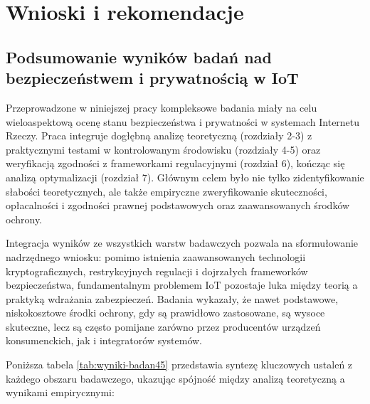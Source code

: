 \chapter{Wnioski i rekomendacje}
\label{chap:rozdzial8}

\section{Podsumowanie wyników badań nad bezpieczeństwem i prywatnością w IoT}

Przeprowadzone w niniejszej pracy kompleksowe badania miały na celu wieloaspektową ocenę stanu bezpieczeństwa i prywatności w systemach Internetu Rzeczy. Praca integruje dogłębną analizę teoretyczną (rozdziały 2-3) z praktycznymi testami w kontrolowanym środowisku (rozdziały 4-5) oraz weryfikacją zgodności z frameworkami regulacyjnymi (rozdział 6), kończąc się analizą optymalizacji (rozdział 7). Głównym celem było nie tylko zidentyfikowanie słabości teoretycznych, ale także empiryczne zweryfikowanie skuteczności, opłacalności i zgodności prawnej podstawowych oraz zaawansowanych środków ochrony.

Integracja wyników ze wszystkich warstw badawczych pozwala na sformułowanie nadrzędnego wniosku: pomimo istnienia zaawansowanych technologii kryptograficznych, restrykcyjnych regulacji i dojrzałych frameworków bezpieczeństwa, fundamentalnym problemem IoT pozostaje luka między teorią a praktyką wdrażania zabezpieczeń. Badania wykazały, że nawet podstawowe, niskokosztowe środki ochrony, gdy są prawidłowo zastosowane, są wysoce skuteczne, lecz są często pomijane zarówno przez producentów urządzeń konsumenckich, jak i integratorów systemów.

Poniższa tabela \ref{tab:wyniki-badan45} przedstawia syntezę kluczowych ustaleń z każdego obszaru badawczego, ukazując spójność między analizą teoretyczną a wynikami empirycznymi:

